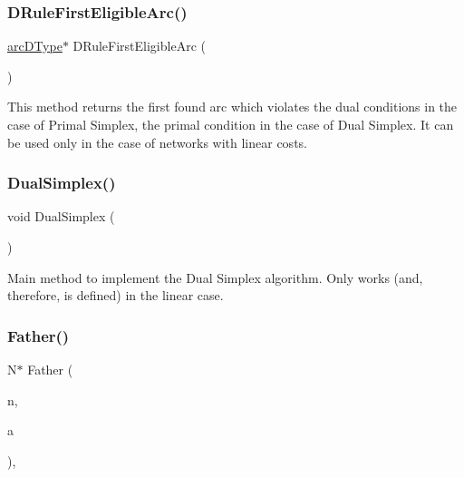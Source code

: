 \subsubsection{\texorpdfstring{D\+Rule\+First\+Eligible\+Arc()}{DRuleFirstEligibleArc()}}
{\footnotesize\ttfamily \mbox{\hyperlink{struct_m_c_f_simplex_1_1arc_d_type}{arc\+D\+Type}}$\ast$ D\+Rule\+First\+Eligible\+Arc (\begin{DoxyParamCaption}\item[{void}]{ }\end{DoxyParamCaption})\hspace{0.3cm}{\ttfamily [private]}}

This method returns the first found arc which violates the dual conditions in the case of Primal Simplex, the primal condition in the case of Dual Simplex. It can be used only in the case of networks with linear costs. \mbox{\label{class_m_c_f_simplex_a0cd80ca2cfd4f7467a5d1c359b6c4d1e}} 
\subsubsection{\texorpdfstring{Dual\+Simplex()}{DualSimplex()}}
{\footnotesize\ttfamily void Dual\+Simplex (\begin{DoxyParamCaption}\item[{void}]{ }\end{DoxyParamCaption})\hspace{0.3cm}{\ttfamily [private]}}

Main method to implement the Dual Simplex algorithm. Only works (and, therefore, is defined) in the linear case. \mbox{\label{class_m_c_f_simplex_aebb13b76385502fc2dbc8897ed848554}} 
\subsubsection{\texorpdfstring{Father()}{Father()}}
{\footnotesize\ttfamily N$\ast$ Father (\begin{DoxyParamCaption}\item[{N $\ast$}]{n,  }\item[{A $\ast$}]{a }\end{DoxyParamCaption})\hspace{0.3cm}{\ttfamily [inline]}, {\ttfamily [private]}}

